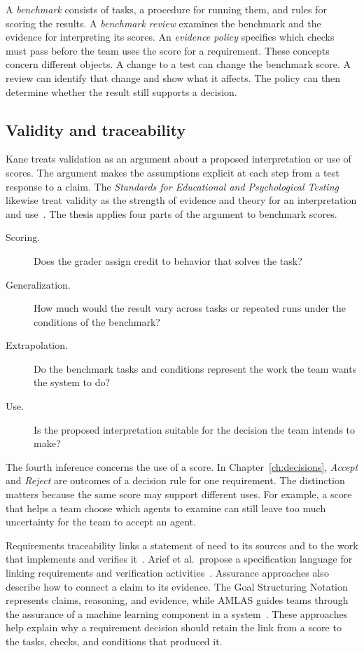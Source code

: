 A \emph{benchmark} consists of tasks, a procedure for running them, and rules for scoring the results. A \emph{benchmark review} examines the benchmark and the evidence for interpreting its scores. An \emph{evidence policy} specifies which checks must pass before the team uses the score for a requirement. These concepts concern different objects. A change to a test can change the benchmark score. A review can identify that change and show what it affects. The policy can then determine whether the result still supports a decision.

\subsection{Validity and traceability}

Kane treats validation as an argument about a proposed interpretation or use of scores. The argument makes the assumptions explicit at each step from a test response to a claim. The \emph{Standards for Educational and Psychological Testing} likewise treat validity as the strength of evidence and theory for an interpretation and use~\cite{kane_validation,aera_apa_ncme_standards_2014}. The thesis applies four parts of the argument to benchmark scores.

\begin{description}
    \item[Scoring.] Does the grader assign credit to behavior that solves the task?
    \item[Generalization.] How much would the result vary across tasks or repeated runs under the conditions of the benchmark?
    \item[Extrapolation.] Do the benchmark tasks and conditions represent the work the team wants the system to do?
    \item[Use.] Is the proposed interpretation suitable for the decision the team intends to make?
\end{description}

The fourth inference concerns the use of a score. In Chapter~\ref{ch:decisions}, \emph{Accept} and \emph{Reject} are outcomes of a decision rule for one requirement. The distinction matters because the same score may support different uses. For example, a score that helps a team choose which agents to examine can still leave too much uncertainty for the team to accept an agent.

Requirements traceability links a statement of need to its sources and to the work that implements and verifies it~\cite{gotel_traceability_1994}. Arief et al.\ propose a specification language for linking requirements and verification activities~\cite{arief_vnvspec_2026}. Assurance approaches also describe how to connect a claim to its evidence. The Goal Structuring Notation represents claims, reasoning, and evidence, while AMLAS guides teams through the assurance of a machine learning component in a system~\cite{kelly_safety_cases_1998,hawkins_amlas_2021,burton_assurance_model_2022}. These approaches help explain why a requirement decision should retain the link from a score to the tasks, checks, and conditions that produced it.

